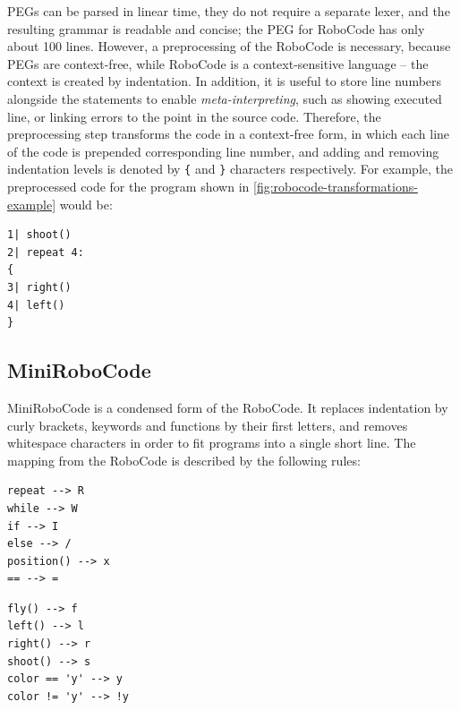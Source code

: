 PEGs can be parsed in linear time, they do not require a separate lexer,
and the resulting grammar is readable and concise;
the PEG for RoboCode %
has only about 100 lines. %
However, a preprocessing of the RoboCode is necessary, because
PEGs are context-free,
while RoboCode is a context-sensitive language
-- the context is created by indentation.
In addition, it is useful to store line numbers alongside the statements
to enable \emph{meta-interpreting},
such as showing executed line, or linking errors to the point in the source code.
Therefore, the preprocessing step transforms the code in a context-free form,
in which each line of the code is prepended corresponding line number,
and adding and removing indentation levels is denoted by \texttt{\{}
and \texttt{\}} characters respectively.
For example, the preprocessed code for the program shown in
\cref{fig:robocode-transformations-example} would be:
\begin{lstlisting}
1| shoot()
2| repeat 4:
{
3| right()
4| left()
}
\end{lstlisting}

\subsection{MiniRoboCode}
\label{sec:minirobocode}

MiniRoboCode is a condensed form of the RoboCode.
It replaces indentation by curly brackets,
keywords and functions by their first letters,
and removes whitespace characters
in order to fit programs into a single short line.
The mapping from the RoboCode is described by the following rules:
\smallskip

\noindent\begin{minipage}{.49\textwidth}
\begin{lstlisting}[numbers=none]
repeat --> R
while --> W
if --> I
else --> /
position() --> x
== --> =
\end{lstlisting}
\end{minipage}\hfill
\begin{minipage}{.49\textwidth}
\begin{lstlisting}[numbers=none]
fly() --> f
left() --> l
right() --> r
shoot() --> s
color == 'y' --> y
color != 'y' --> !y
\end{lstlisting}
\end{minipage}

